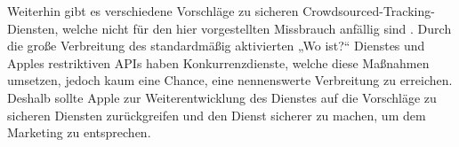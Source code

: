 Weiterhin gibt es verschiedene Vorschläge zu sicheren Crowdsourced-Tracking-Diensten, welche nicht für den hier vorgestellten Missbrauch anfällig sind \cite{Garg_Secure_Tracker,Weller_BLE_Finders}.
Durch die große Verbreitung des standardmäßig aktivierten „Wo ist?“ Dienstes und Apples restriktiven \acp{API} haben Konkurrenzdienste, welche diese Maßnahmen umsetzen, jedoch kaum eine Chance, eine nennenswerte Verbreitung zu erreichen.
Deshalb sollte Apple zur Weiterentwicklung des Dienstes auf die Vorschläge zu sicheren Diensten zurückgreifen und den Dienst sicherer zu machen, um dem Marketing zu entsprechen.